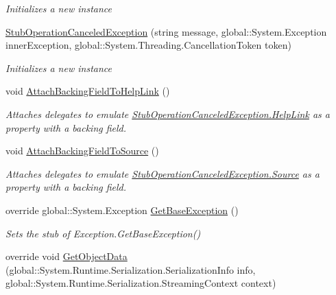 \begin{DoxyCompactItemize}
\begin{DoxyCompactList}\small\item\em Initializes a new instance\end{DoxyCompactList}\item 
\hyperlink{class_system_1_1_fakes_1_1_stub_operation_canceled_exception_a31387a0fc574a78e86aa1e0369adbe3a}{Stub\-Operation\-Canceled\-Exception} (string message, global\-::\-System.\-Exception inner\-Exception, global\-::\-System.\-Threading.\-Cancellation\-Token token)
\begin{DoxyCompactList}\small\item\em Initializes a new instance\end{DoxyCompactList}\item 
void \hyperlink{class_system_1_1_fakes_1_1_stub_operation_canceled_exception_a89adc6a2173f03ead6ab3489192fad39}{Attach\-Backing\-Field\-To\-Help\-Link} ()
\begin{DoxyCompactList}\small\item\em Attaches delegates to emulate \hyperlink{class_system_1_1_fakes_1_1_stub_operation_canceled_exception_aff3a629ac57d115cd47107300ab7333c}{Stub\-Operation\-Canceled\-Exception.\-Help\-Link} as a property with a backing field.\end{DoxyCompactList}\item 
void \hyperlink{class_system_1_1_fakes_1_1_stub_operation_canceled_exception_a3fcfaefcdd853dca2512de3a12cf2d52}{Attach\-Backing\-Field\-To\-Source} ()
\begin{DoxyCompactList}\small\item\em Attaches delegates to emulate \hyperlink{class_system_1_1_fakes_1_1_stub_operation_canceled_exception_a6ad7e55f09cbe9cfa9ce7c7fe87ad090}{Stub\-Operation\-Canceled\-Exception.\-Source} as a property with a backing field.\end{DoxyCompactList}\item 
override global\-::\-System.\-Exception \hyperlink{class_system_1_1_fakes_1_1_stub_operation_canceled_exception_a1b237618661ece84648b0d8beeb993d8}{Get\-Base\-Exception} ()
\begin{DoxyCompactList}\small\item\em Sets the stub of Exception.\-Get\-Base\-Exception()\end{DoxyCompactList}\item 
override void \hyperlink{class_system_1_1_fakes_1_1_stub_operation_canceled_exception_a7118e0761bedc9dd6e6055f8ea12e189}{Get\-Object\-Data} (global\-::\-System.\-Runtime.\-Serialization.\-Serialization\-Info info, global\-::\-System.\-Runtime.\-Serialization.\-Streaming\-Context context)

\end{DoxyCompactItemize}
